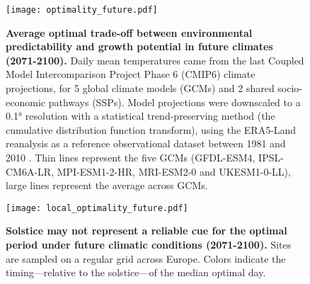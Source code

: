 \documentclass[11pt,letter]{article}
\begin{document}
\vspace*{-0.7cm}
\begin{figure}[h]
\centering
\texttt{[image: optimality\_future.pdf]}
\vspace*{-0.5cm}
\caption{\textbf{Average optimal trade-off between environmental predictability and growth potential in future climates (2071-2100).} Daily mean temperatures came from the last Coupled Model Intercomparison Project Phase 6 (CMIP6) climate  projections, for 5 global climate models (GCMs) and 2 shared socio-economic pathways (SSPs). Model projections were downscaled to a 0.1° resolution with a statistical trend-preserving method (the cumulative distribution function transform), using the ERA5-Land reanalysis as a reference observational dataset between 1981 and 2010 \citep{Noel2022}. Thin lines represent the five GCMs (GFDL-ESM4, IPSL-CM6A-LR, MPI-ESM1-2-HR, MRI-ESM2-0 and UKESM1-0-LL), large lines represent the average across GCMs.}
\label{fig:future}
\end{figure}

\vspace*{-1.2cm}
\begin{figure}[h]
\centering
\texttt{[image: local\_optimality\_future.pdf]}
\vspace*{-0.4cm}
\caption{\textbf{Solstice may not represent a reliable cue for the optimal period under future climatic conditions (2071-2100).} Sites are sampled on a regular grid across Europe. Colors indicate the timing—relative to the solstice—of the median optimal day.}
\label{fig:holocene}
\vspace*{-10cm}
\end{figure}


\clearpage
\vspace*{0cm}

\end{document}
